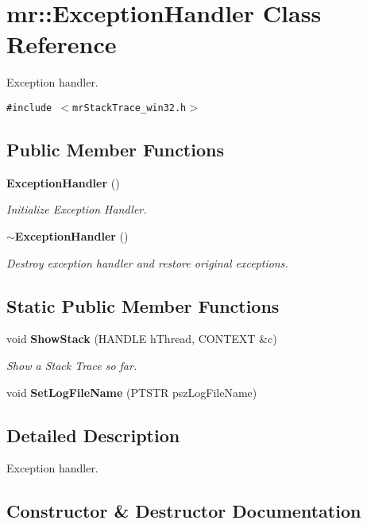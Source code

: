 \section{mr::Exception\-Handler Class Reference}
\label{classmr_1_1ExceptionHandler}
Exception handler.  


{\tt \#include $<$mr\-Stack\-Trace\_\-win32.h$>$}

\subsection*{Public Member Functions}
\begin{CompactItemize}
\item 
{\bf Exception\-Handler} ()
\begin{CompactList}\small\item\em Initialize Exception Handler. \item\end{CompactList}\item 
{\bf $\sim$Exception\-Handler} ()
\begin{CompactList}\small\item\em Destroy exception handler and restore original exceptions. \item\end{CompactList}\end{CompactItemize}
\subsection*{Static Public Member Functions}
\begin{CompactItemize}
\item 
void {\bf Show\-Stack} (HANDLE h\-Thread, CONTEXT \&c)
\begin{CompactList}\small\item\em Show a Stack Trace so far. \item\end{CompactList}\item 
void {\bf Set\-Log\-File\-Name} (PTSTR psz\-Log\-File\-Name)
\end{CompactItemize}


\subsection{Detailed Description}
Exception handler. 



\subsection{Constructor \& Destructor Documentation}
